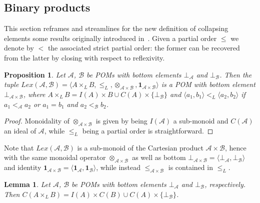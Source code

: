 \documentclass[a4paper]{elsarticle}
\newtheorem{lemma}{Lemma}
\newtheorem{proposition}{Proposition}
\newcommand{\monop}{\otimes}
\newcommand{\1}{\mathbf{1}}
\begin{document}
\subsection{Binary products}\label{sec:bynary}

This section reframes and streamlines for the new definition of collapsing elements some results originally
introduced in~\cite{GadducciHMW13}. Given a partial order $\leq$ we denote by $<$ the associated strict 
partial order: the former can be recovered from the latter by closing with respect to reflexivity.

\begin{proposition}\label{prop:lexBI}
	Let $\mathcal{A}$, $\mathcal{B}$ be POMs with bottom elements $\bot_\mathcal{A}$ and $\bot_\mathcal{B}$.
	Then the tuple $Lex(\mathcal{A}, \mathcal{B}) = 
	\langle A \times_L B, \leq_L, \monop_{\mathcal{A} \times \mathcal{B}}, \1_{\mathcal{A} \times \mathcal{B}} \rangle$
	is a POM with bottom element $\bot_{\mathcal{A} \times \mathcal{B}}$,
	where $A \times_L B = I(A) \times B \cup C(A) \times \{\bot_\mathcal{B}\}$ and
		$\langle a_1, b_1\rangle <_L \langle a_2, b_2\rangle$ if $a_1 <_\mathcal{A} a_2$ or $a_1 = b_1$ 
		and  $a_2 <_\mathcal{B} b_2$.
\end{proposition}

\begin{proof}
	Monoidality of $\monop_{\mathcal{A} \times \mathcal{B}}$ is given by being $I(\mathcal{A})$ a sub-monoid
	and $C(\mathcal{A})$ an ideal of $\mathcal{A}$, while $\leq_L$ being a partial order is straightforward.
\end{proof}

Note that $Lex(\mathcal{A},\mathcal{B})$ is a sub-monoid of the Cartesian product $\mathcal{A} \times \mathcal{B}$,
hence with the same monoidal operator $\monop_{\mathcal{A} \times \mathcal{B}}$ as well as 
bottom $\bot_{\mathcal{A} \times \mathcal{B}} = \langle \bot_\mathcal{A}, \bot_\mathcal{B} \rangle$ and
identity $\1_{\mathcal{A} \times \mathcal{B}} = \langle \1_\mathcal{A}, \1_\mathcal{B} \rangle$,
while instead $\leq_{\mathcal{A} \times \mathcal{B}}$ is contained in $\leq_L$.
%

\begin{lemma}
Let $\mathcal{A}$, $\mathcal{B}$ be POMs with bottom elements $\bot_\mathcal{A}$ and $\bot_\mathcal{B}$, 
respectively.
Then $C(A \times_L B) = I(A) \times C(B) \cup C(A) \times \{\bot_\mathcal{B}\}$.
\end{lemma}
\end{document}
